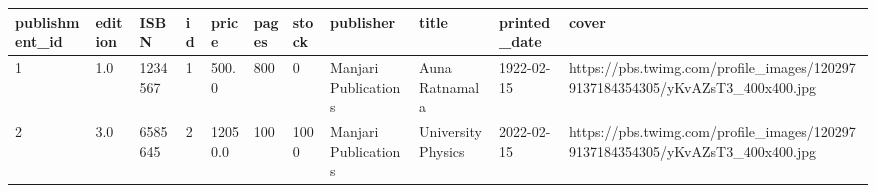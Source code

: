 \begin{longtable}[]{@{}lllllllllll@{}}
\toprule
publishment\_id & edition & ISBN & id & price & pages & stock &
publisher & title & printed\_date & cover \\
\midrule
\endhead
1 & 1.0 & 1234567 & 1 & 500.0 & 800 & 0 & Manjari Publications & Auna
Ratnamala & 1922-02-15 &
https://pbs.twimg.com/profile\_images/1202979137184354305/yKvAZsT3\_400x400.jpg \\
2 & 3.0 & 6585645 & 2 & 12050.0 & 100 & 1000 & Manjari Publications &
University Physics & 2022-02-15 &
https://pbs.twimg.com/profile\_images/1202979137184354305/yKvAZsT3\_400x400.jpg \\
\bottomrule
\end{longtable}
